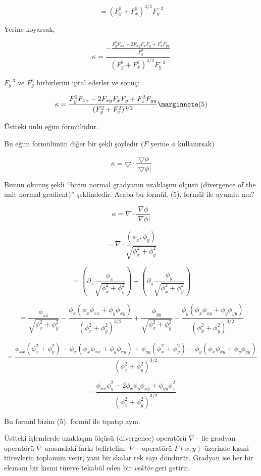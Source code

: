 \documentclass[12pt,fleqn]{article}\usepackage{../../common}
\begin{document}
$$ = (F_y^2 + F_x^2)^{3/2}F_y^{-3} $$

Yerine koyarsak,

$$ 
\kappa = \frac{\displaystyle
- \frac{F_y^2F_{xx} - 2F_{xy}F_xF_y + F_x^2F_{yy}}{F_y^3}}
{(F_y^2 + F_x^2)^{3/2}F_y^{-3}}
 $$

$F_y^{-3}$ ve $F_y^{3}$ birbirlerini iptal ederler ve sonuç:

$$
\kappa = \frac{F_y^2F_{xx} - 2F_{xy}F_xF_y +
    F_x^2F_{yy}}{(F_y^2 + F_x^2)^{3/2}}
\mlabel{5}
$$

Üstteki ünlü eğim  formülüdür. 

Bu eğim formülünün diğer bir şekli şöyledir ($F$ yerine $\phi$ kullanırsak)

$$ \kappa = \bigtriangledown \cdot \frac{\bigtriangledown \phi}{|\bigtriangledown \phi|} $$

Bunun okunuş şekli ``birim normal gradyanın uzaklaşım ölçüsü (divergence of the
unit normal gradient)'' şeklindedir. Acaba bu formül, (5). formül ile
uyumlu mu?

$$ \kappa = \nabla \cdot \frac{\nabla \phi}{|\nabla \phi|}  $$

$$ = \nabla \cdot \frac{(\phi_x,\phi_y)}{\sqrt{\phi_x^2+\phi_y^2}} $$

$$ = \left(\partial_x \frac{\phi_x}{\sqrt{\phi_x^2+\phi_y^2}}\right)+ 
\left(\partial_y \frac{\phi_y}{\sqrt{\phi_x^2+\phi_y^2}}\right)  $$

$$ = \frac{\phi_{xx}}{\sqrt{\phi_x^2+\phi_y^2}} - \frac{\phi_x (\phi_x\phi_{xx}+\phi_y\phi_{xy})}
{(\phi_x^2+\phi_y^2)^{3/2}} +
\frac{\phi_{yy}}{\sqrt{\phi_x^2+\phi_y^2}} - \frac{\phi_y(\phi_x\phi_{xy}+\phi_y\phi_{yy})}
{(\phi_x^2+\phi_y^2)^{3/2}}  $$

$$ = \frac{\phi_{xx}(\phi_x^2+\phi_y^2) - \phi_x
  (\phi_x\phi_{xx}+\phi_y\phi_{xy}) +\phi_{yy}(\phi_x^2+\phi_y^2) -
  \phi_y(\phi_x\phi_{xy}+\phi_y\phi_{yy})}{(\phi_x^2+\phi_y^2)^{3/2}} $$

$$ = \frac{\phi_{xx}\phi_y^2 - 2\phi_x\phi_y\phi_{xy} + \phi_{yy}\phi_x^2}{(\phi_x^2+\phi_y^2)^{3/2}}  $$

Bu formül bizim (5). formül ile tıpatıp aynı.

Üstteki işlemlerde uzaklaşım ölçüsü (divergence) operatörü $\nabla \cdot$
ile gradyan operatörü $\nabla$ arasındaki farkı belirtelim: $\nabla \cdot$
operatörü $F(x,y)$ üzerinde kısmi türevlerin toplamını verir, yani bir
skalar tek sayı döndürür. Gradyan ise her bir elemanı bir kısmi türeve
tekabül eden bir {\em vektör} geri getirir.
\end{document}
